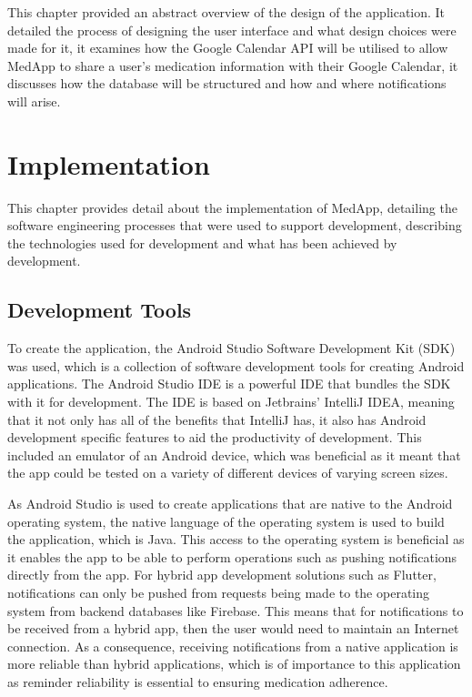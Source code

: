 \documentclass{l4proj}
\begin{document}
This chapter provided an abstract overview of the design of the application. It detailed the process of designing the user interface and what design choices were made for it, it examines how the Google Calendar API will be utilised to allow MedApp to share a user's medication information with their Google Calendar, it discusses how the database will be structured and how and where notifications will arise.

\chapter{Implementation}

This chapter provides detail about the implementation of MedApp, detailing the software engineering processes that were used to support development, describing the technologies used for development and what has been achieved by development. 

\section{Development Tools}

To create the application, the Android Studio Software Development Kit (SDK) was used, which is a collection of software development tools for creating Android applications. The Android Studio IDE is a powerful IDE that bundles the SDK with it for development. The IDE is based on Jetbrains' IntelliJ IDEA, meaning that it not only has all of the benefits that IntelliJ has, it also has Android development specific features to aid the productivity of development. This included an emulator of an Android device, which was beneficial as it meant that the app could be tested on a variety of different devices of varying screen sizes.

As Android Studio is used to create applications that are native to the Android operating system, the native language of the operating system is used to build the application, which is Java. This access to the operating system is beneficial as it enables the app to be able to perform operations such as pushing notifications directly from the app. For hybrid app development solutions such as Flutter, notifications can only be pushed from requests being made to the operating system from backend databases like Firebase. This means that for notifications to be received from a hybrid app, then the user would need to maintain an Internet connection. As a consequence, receiving notifications from a native application is more reliable than hybrid applications, which is of importance to this application as reminder reliability is essential to ensuring medication adherence.
\end{document}
